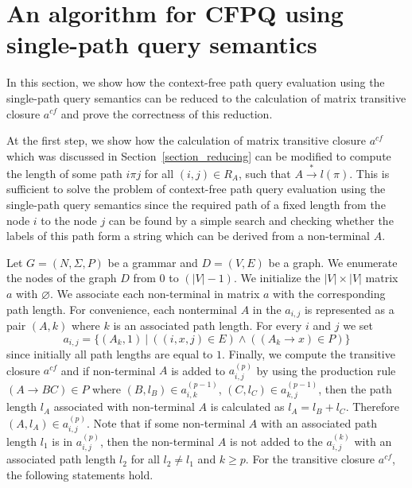 \section{An algorithm for CFPQ using single-path query semantics}
In this section, we show how the context-free path query evaluation using the single-path query semantics can be reduced to the calculation of matrix transitive closure $a^{cf}$ and prove the correctness of this reduction.

At the first step, we show how the calculation of matrix transitive closure $a^{cf}$ which was discussed in Section~\ref{section_reducing} can be modified to compute the length of some path $i \pi j$ for all $(i,j) \in R_A$, such that $A \xrightarrow{*} l(\pi)$. This is sufficient to solve the problem of context-free path query evaluation using the single-path query semantics since the required path of a fixed length from the node $i$ to the node $j$ can be found by a simple search and checking whether the labels of this path form a string which can be derived from a non-terminal $A$.

Let $G = (N,\Sigma,P)$ be a grammar and $D = (V, E)$ be a graph. We enumerate the nodes of the graph $D$ from 0 to $(|V| - 1)$. We initialize the $|V| \times |V|$ matrix $a$ with $\varnothing$. We associate each non-terminal in matrix $a$ with the corresponding path length. For convenience, each nonterminal $A$ in the $a_{i,j}$ is represented as a pair $(A,k)$ where $k$ is an associated path length. For every $i$ and $j$ we set $$a_{i,j} = \{(A_k,1)~|~((i,x,j) \in E) \wedge ((A_k \rightarrow x) \in P)\}$$ since initially all path lengths are equal to $1$. Finally, we compute the transitive closure $a^{cf}$ and if non-terminal $A$ is added to $a^{(p)}_{i,j}$ by using the production rule $(A \rightarrow B C) \in P$ where $(B,l_B) \in a^{(p-1)}_{i,k}$, $(C,l_C) \in a^{(p-1)}_{k,j}$, then the path length $l_A$ associated with non-terminal $A$ is calculated as $l_A = l_B + l_C$. Therefore $(A, l_A) \in a^{(p)}_{i,j}$. Note that if some non-terminal $A$ with an associated path length $l_1$ is in $a^{(p)}_{i,j}$, then the non-terminal $A$ is not added to the $a^{(k)}_{i,j}$ with an associated path length $l_2$ for all $l_2 \neq l_1$ and $k \geq p$. For the transitive closure $a^{cf}$, the following statements hold.

